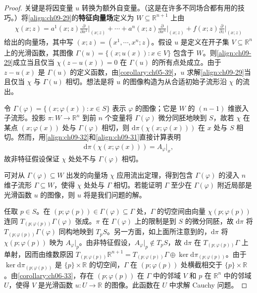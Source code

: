 \documentclass[../../main.tex]{subfiles}
\begin{document}
\begin{proof}
关键是将因变量 $u$ 转换为额外自变量。（这是在许多不同场合都有用的技巧。）将\eqref{align:ch09-29}的\textbf{特征向量场}定义为 $W\subseteq\mathbb{R}^{n+1}$ 上由
\begin{align}
\chi(x;z)=a^1(x;z)\frac{\partial}{\partial x^1}\bigg|_{(x;z)}+\cdots+a^n(x;z)\frac{\partial}{\partial x^n}\bigg|_{(x;z)}+f(x;z)\frac{\partial}{\partial z}\bigg|_{(x;z)} \label{align:ch09-32}
\end{align}
给出的向量场，其中写 $(x;z)=(x^1,\cdots ,x^n;z)$。假设 $u$ 是定义在开子集 $V\subseteq\mathbb{R}^n$ 上的光滑函数，其图像 $\Gamma(u)=\{(x;u(x)):x\in V\}$ 包含于 $W$。则\eqref{align:ch09-29}成立当且仅当 $\chi(z-u(x))=0$ 在 $\Gamma(u)$ 的所有点处成立。由于 $z-u(x)$ 是 $\Gamma(u)$ 的定义函数，由\cref{corollary:ch05-39}，$u$ 求解\eqref{align:ch09-29}当且仅当 $\chi$ 与 $\Gamma(u)$ 相切。想法是将 $u$ 的图像构造为从合适初始子流形沿 $\chi$ 的流出。

令 $\Gamma(\varphi)=\{(x;\varphi(x)):x\in S\}$ 表示 $\varphi$ 的图像；它是 $W$ 的 $(n-1)$ 维嵌入子流形。投影 $\pi\colon W\to\mathbb{R}^n$ 到前 $n$ 个变量将 $\Gamma(\varphi)$ 微分同胚地映到 $S$，故若 $\chi$ 在某点 $(x;\varphi(x))$ 处与 $\Gamma(\varphi)$ 相切，则 $\mathrm{d}\pi(\chi(x;\varphi(x)))$ 在 $x$ 处与 $S$ 相切。然而，用\eqref{align:ch09-32}和\eqref{align:ch09-31}直接计算表明
\begin{align*}
\mathrm{d}\pi(\chi(x;\varphi(x)))=A_\varphi\big|_x,
\end{align*}
故非特征假设保证 $\chi$ 处处不与 $\Gamma(\varphi)$ 相切。

可对从 $\Gamma(\varphi)\subseteq W$ 出发的向量场 $\chi$ 应用流出定理，得到包含 $\Gamma(\varphi)$ 的浸入 $n$ 维子流形 $\Gamma\subseteq W$，使得 $\chi$ 处处与 $\Gamma$ 相切。若能证明 $\Gamma$ 至少在 $\Gamma(\varphi)$ 附近局部是光滑函数 $u$ 的图像，则 $u$ 将是我们问题的解。

任取 $p\in S$。在 $(p;\varphi(p))\in\Gamma(\varphi)\subseteq\Gamma$ 处，$\Gamma$ 的切空间由向量 $\chi(p;\varphi(p))$ 连同 $T_{(p;\varphi(p))}\Gamma(\varphi)$ 张成。$\pi$ 在 $\Gamma(\varphi)$ 上的限制是到 $S$ 的微分同胚，故 $\mathrm{d}\pi$ 将 $T_{(p;\varphi(p))}\Gamma(\varphi)$ 同构地映到 $T_pS$。另一方面，如上面所注意到的，$\mathrm{d}\pi$ 将 $\chi(p;\varphi(p))$ 映为 $A_\varphi|_p$。由非特征假设，$A_\varphi|_p\notin T_pS$，故 $\mathrm{d}\pi$ 在 $T_{(p;\varphi(p))}\Gamma$ 上单射，因而由维数原因 $T_{(p;\varphi(p))}\mathbb{R}^{n+1}=T_{(p;\varphi(p))}\Gamma\oplus\ker\mathrm{d}\pi_{(p;\varphi(p))}$。由于 $\ker\mathrm{d}\pi_{(p;\varphi(p))}$ 是 $\{p\}\times\mathbb{R}$ 的切空间，$\Gamma$ 在 $(p;\varphi(p))$ 处横截相交于 $\{p\}\times\mathbb{R}$。由\cref{corollary:ch06-33}，存在 $(p;\varphi(p))$ 在 $\Gamma$ 中的邻域 $V$ 和 $p$ 在 $\mathbb{R}^n$ 中的邻域 $U$，使得 $V$ 是光滑函数 $u\colon U\to\mathbb{R}$ 的图像。此函数在 $U$ 中求解 Cauchy 问题。


\end{proof}
\end{document}
